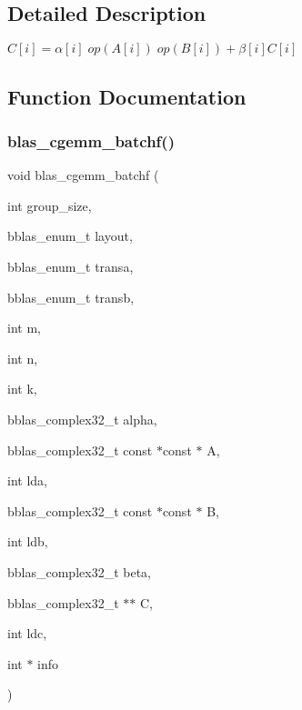 \subsection{Detailed Description}
$ C[i] = \alpha[i] \;op(A[i]) \;op(B[i]) + \beta[i] C[i] $ 



\subsection{Function Documentation}
\mbox{\label{group__gemm__batchf_ga7638ee53c76c8e1b40dffa9574f5cbad}} 
\subsubsection{\texorpdfstring{blas\+\_\+cgemm\+\_\+batchf()}{blas\_cgemm\_batchf()}}
{\footnotesize\ttfamily void blas\+\_\+cgemm\+\_\+batchf (\begin{DoxyParamCaption}\item[{int}]{group\+\_\+size,  }\item[{bblas\+\_\+enum\+\_\+t}]{layout,  }\item[{bblas\+\_\+enum\+\_\+t}]{transa,  }\item[{bblas\+\_\+enum\+\_\+t}]{transb,  }\item[{int}]{m,  }\item[{int}]{n,  }\item[{int}]{k,  }\item[{bblas\+\_\+complex32\+\_\+t}]{alpha,  }\item[{bblas\+\_\+complex32\+\_\+t const $\ast$const $\ast$}]{A,  }\item[{int}]{lda,  }\item[{bblas\+\_\+complex32\+\_\+t const $\ast$const $\ast$}]{B,  }\item[{int}]{ldb,  }\item[{bblas\+\_\+complex32\+\_\+t}]{beta,  }\item[{bblas\+\_\+complex32\+\_\+t $\ast$$\ast$}]{C,  }\item[{int}]{ldc,  }\item[{int $\ast$}]{info }\end{DoxyParamCaption})}

